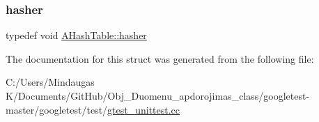 \mbox{\label{struct_a_hash_table_af0df4ce57a783be396e80cb8df6b6259}} 
\subsubsection{\texorpdfstring{hasher}{hasher}\hspace{0.1cm}{\footnotesize\ttfamily [3/3]}}
{\footnotesize\ttfamily typedef void \mbox{\hyperlink{struct_a_hash_table_af0df4ce57a783be396e80cb8df6b6259}{A\+Hash\+Table\+::hasher}}}



The documentation for this struct was generated from the following file\+:\begin{DoxyCompactItemize}
\item 
C\+:/\+Users/\+Mindaugas K/\+Documents/\+Git\+Hub/\+Obj\+\_\+\+Duomenu\+\_\+apdorojimas\+\_\+class/googletest-\/master/googletest/test/\mbox{\hyperlink{googletest-master_2googletest_2test_2gtest__unittest_8cc}{gtest\+\_\+unittest.\+cc}}\end{DoxyCompactItemize}
